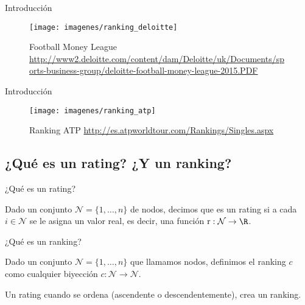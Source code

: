 \documentclass[10pt,hyperref={unicode}]{beamer}
\begin{document}
	\begin{frame}{Introducción}
		\begin{figure}
			\centering
			\texttt{[image: imagenes/ranking\_deloitte]}
			\caption{Football Money League \url{http://www2.deloitte.com/content/dam/Deloitte/uk/Documents/sports-business-group/deloitte-football-money-league-2015.PDF}}
			\label{fig:ranking_deloitte}
		\end{figure}
	\end{frame}
	
	\begin{frame}{Introducción}
		\begin{figure}
			\centering
			\texttt{[image: imagenes/ranking\_atp]}
			\caption{Ranking ATP \url{http://es.atpworldtour.com/Rankings/Singles.aspx}}
			\label{fig:ranking_atp}
		\end{figure}
	\end{frame}
	
	\subsection{¿Qué es un rating? ¿Y un ranking?}
	
	\begin{frame}{¿Qué es un rating?}
		\begin{defi}
			Dado un conjunto $\mathcal{N} = \{1,\dots, n\}$ de nodos, decimos que es un rating si a cada $i \in \mathcal{N}$ se le asigna un valor real, es decir, una función $\mathrm{r} : \mathcal{N} \to \R$.
		\end{defi}
	\end{frame}
	
	\begin{frame}{¿Qué es un ranking?}
		\begin{defi} \label{def:ranking}
			Dado un conjunto $\mathcal{N} = \{1,\dots,n\}$ que llamamos nodos, definimos el ranking $c$ como cualquier biyección $c : \mathcal{N} \to \mathcal{N}$.
		\end{defi}
		
		Un rating cuando se ordena (ascendente o descendentemente), crea un ranking.
	\end{frame}
	
\end{document}
